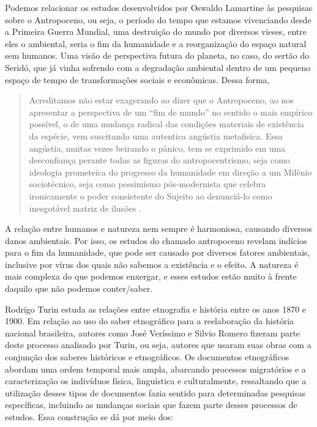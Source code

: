 \begin{refsection}
    Podemos relacionar os estudos desenvolvidos por Oswaldo Lamartine às pesquisas sobre o Antropoceno, ou seja, o período do tempo que estamos vivenciando desde a Primeira Guerra Mundial, uma destruição do mundo por diversos vieses, entre eles o ambiental, seria o fim da humanidade e a reorganização do espaço natural sem humanos. Uma visão de perspectiva futura do planeta, no caso, do sertão do Seridó, que já vinha sofrendo com a degradação ambiental dentro de um pequeno espaço de tempo de transformações sociais e econômicas. Dessa forma,  

    \begin{quotation}
        Acreditamos não estar exagerando ao dizer que o Antropoceno, ao nos apresentar a perspectiva de um “fim de mundo” no sentido o mais empírico possível, o de uma mudança radical das condições materiais de existência da espécie, vem suscitando uma autentica angústia metafisica. Essa angústia, muitas vezes beirando o pânico, tem se exprimido em uma desconfiança perante todas as figuras do antropocentrismo, seja como ideologia prometeica do progresso da humanidade em direção a um Milênio sociotécnico, seja como pessimismo pós-modernista que celebra ironicamente o poder consistente do Sujeito ao denunciá-lo como inesgotável matriz de ilusões \cite[p.~45]{DANOWSKIAndVIVEIROSDECASTRO2014mundo}. 
    \end{quotation}

    A relação entre humanos e natureza nem sempre é harmoniosa, causando diversos danos ambientais. Por isso, os estudos do chamado antropoceno revelam indícios para o fim da humanidade, que pode ser causado por diversos fatores ambientais, inclusive por vírus dos quais não sabemos a existência e o efeito. A natureza é mais complexa do que podemos enxergar, e esses estudos estão muito à frente daquilo que não podemos conter/saber. 

    Rodrigo Turin estuda as relações entre etnografia e história entre os anos 1870 e 1900. Em relação ao uso do saber etnográfico para a reelaboração da história nacional brasileira, autores como José Veríssimo e Silvio Romero fizeram parte deste processo analisado por Turin, ou seja, autores que usaram suas obras com a conjunção dos saberes históricos e etnográficos. Os documentos etnográficos abordam uma ordem temporal mais ampla, abarcando processos migratórios e a caracterização os indivíduos física, linguística e culturalmente, ressaltando que a utilização desses tipos de documentos fazia sentido para determinadas pesquisas específicas, incluindo as mudanças sociais que fazem parte desses processos de estudos. Essa construção se dá por meio dos: 


\end{refsection}
